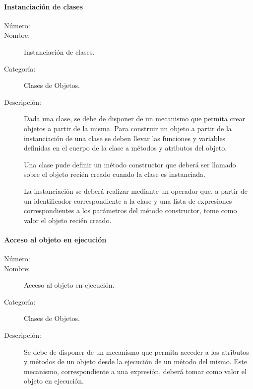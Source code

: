 \paragraph{Instanciación de clases}
	\begin{description}
		\item [Número:] \cn
		\item [Nombre:] Instanciación de clases.
		\item [Categoría:] Clases de Objetos.
		\item [Descripción:] Dada una clase, se debe de disponer de un mecanismo que permita crear objetos a partir de la misma.   
		Para construir un objeto a partir de la instanciación de una clase se deben llevar las funciones y variables definidas en el
		cuerpo de la clase a métodos y atributos del objeto. 
		
		Una clase pude definir un método constructor que deberá ser llamado sobre el objeto recién creado cuando la clase es instanciada.
		
		La instanciación se deberá realizar mediante un operador que, a partir de un identificador correspondiente a la clase y una lista de expresiones 
		correspondientes a los parámetros del método constructor, tome como valor el objeto recién creado.
	\end{description}


\paragraph{Acceso al objeto en ejecución}
	\begin{description}
		\item [Número:] \cn
		\item [Nombre:] Acceso al objeto en ejecución.
		\item [Categoría:] Clases de Objetos.
		\item [Descripción:] Se debe de disponer de un mecanismo que permita acceder a los atributos y métodos de un objeto desde la ejecución 
		de un método del mismo. Este mecanismo, correspondiente a una expresión, deberá tomar como valor el objeto en ejecución. 
	\end{description}

